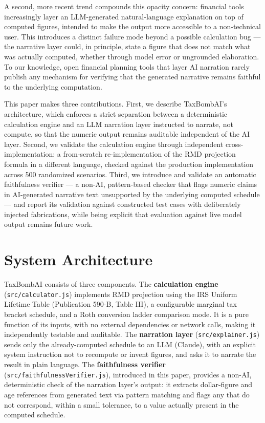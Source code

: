 \documentclass[11pt]{article}
\begin{document}
A second, more recent trend compounds this opacity concern: financial
tools increasingly layer an LLM-generated natural-language explanation
on top of computed figures, intended to make the output more
accessible to a non-technical user. This introduces a distinct failure
mode beyond a possible calculation bug — the narrative layer could, in
principle, state a figure that does not match what was actually
computed, whether through model error or ungrounded elaboration. To our
knowledge, open financial planning tools that layer AI narration rarely
publish any mechanism for verifying that the generated narrative remains
faithful to the underlying computation.

This paper makes three contributions. First, we describe TaxBombAI's
architecture, which enforces a strict separation between a deterministic
calculation engine and an LLM narration layer instructed to narrate,
not compute, so that the numeric output remains auditable independent of
the AI layer. Second, we validate the calculation engine through
independent cross-implementation: a from-scratch re-implementation of
the RMD projection formula in a different language, checked against the
production implementation across 500 randomized scenarios. Third, we
introduce and validate an automatic faithfulness verifier — a non-AI,
pattern-based checker that flags numeric claims in AI-generated
narrative text unsupported by the underlying computed schedule — and
report its validation against constructed test cases with deliberately
injected fabrications, while being explicit that evaluation against live
model output remains future work.

\section{System Architecture}

TaxBombAI consists of three components. The \textbf{calculation
engine} (\texttt{src/calculator.js}) implements RMD projection using the
IRS Uniform Lifetime Table (Publication 590-B, Table III), a
configurable marginal tax bracket schedule, and a Roth conversion ladder
comparison mode. It is a pure function of its inputs, with no external
dependencies or network calls, making it independently testable and
auditable. The \textbf{narration layer} (\texttt{src/explainer.js})
sends only the already-computed schedule to an LLM (Claude), with an
explicit system instruction not to recompute or invent figures, and asks
it to narrate the result in plain language. The \textbf{faithfulness
verifier} (\texttt{src/faithfulnessVerifier.js}), introduced in this
paper, provides a non-AI, deterministic check of the narration layer's
output: it extracts dollar-figure and age references from generated text
via pattern matching and flags any that do not correspond, within a
small tolerance, to a value actually present in the computed schedule.
\end{document}
